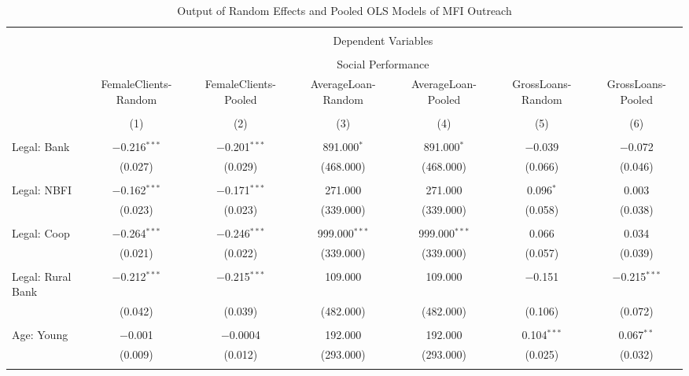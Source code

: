 \documentclass[a4paper, nobind]{templates/ociamthesis}
\begin{document}
\begin{landscape}

\begin{table}[!htbp] \centering 
  \caption{Output of Random Effects and Pooled OLS Models of MFI Outreach} 
  \label{} 
\tiny 
\begin{tabular}{@{\extracolsep{5pt}}lcccccc} 
\\[-1.8ex]\hline 
\hline \\[-1.8ex] 
 & \multicolumn{6}{c}{Dependent Variables} \\ 
\cline{2-7} 
\\[-1.8ex] & \multicolumn{6}{c}{Social Performance} \\ 
 & FemaleClients-Random & FemaleClients-Pooled & AverageLoan- Random & AverageLoan- Pooled & GrossLoans- Random & GrossLoans- Pooled \\ 
\\[-1.8ex] & (1) & (2) & (3) & (4) & (5) & (6)\\ 
\hline \\[-1.8ex] 
 Legal: Bank & $-$0.216$^{***}$ & $-$0.201$^{***}$ & 891.000$^{*}$ & 891.000$^{*}$ & $-$0.039 & $-$0.072 \\ 
  & (0.027) & (0.029) & (468.000) & (468.000) & (0.066) & (0.046) \\ 
  & & & & & & \\ 
 Legal: NBFI & $-$0.162$^{***}$ & $-$0.171$^{***}$ & 271.000 & 271.000 & 0.096$^{*}$ & 0.003 \\ 
  & (0.023) & (0.023) & (339.000) & (339.000) & (0.058) & (0.038) \\ 
  & & & & & & \\ 
 Legal: Coop & $-$0.264$^{***}$ & $-$0.246$^{***}$ & 999.000$^{***}$ & 999.000$^{***}$ & 0.066 & 0.034 \\ 
  & (0.021) & (0.022) & (339.000) & (339.000) & (0.057) & (0.039) \\ 
  & & & & & & \\ 
 Legal: Rural Bank & $-$0.212$^{***}$ & $-$0.215$^{***}$ & 109.000 & 109.000 & $-$0.151 & $-$0.215$^{***}$ \\ 
  & (0.042) & (0.039) & (482.000) & (482.000) & (0.106) & (0.072) \\ 
  & & & & & & \\ 
 Age: Young & $-$0.001 & $-$0.0004 & 192.000 & 192.000 & 0.104$^{***}$ & 0.067$^{**}$ \\ 
  & (0.009) & (0.012) & (293.000) & (293.000) & (0.025) & (0.032) \\ 
  & & & & & & \\ 

\end{tabular}
\end{table}
\end{landscape}
\end{document}
